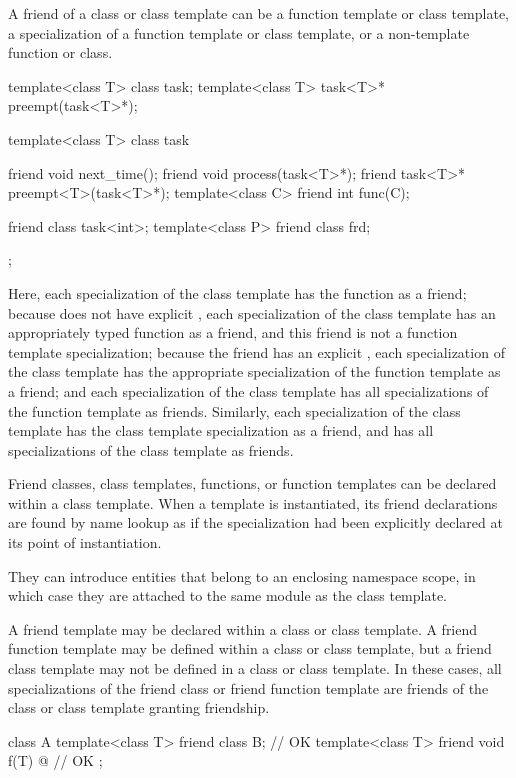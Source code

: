 \pnum
{}%
A friend of a class or class template can be a function template or
class template, a specialization of a function template or class
template, or a non-template function or class.
\begin{example}
\begin{codeblock}
template<class T> class task;
template<class T> task<T>* preempt(task<T>*);

template<class T> class task {
  friend void next_time();
  friend void process(task<T>*);
  friend task<T>* preempt<T>(task<T>*);
  template<class C> friend int func(C);

  friend class task<int>;
  template<class P> friend class frd;
};
\end{codeblock}

Here,
each specialization of the
class template has the function
as a friend;
because
does not have explicit
,
each specialization of the
class template has an appropriately typed function
as a friend, and this friend is not a function template specialization;
because the friend
has an explicit
,
each specialization of the
class template has the appropriate specialization of the function
template
as a friend;
and each specialization of the
class template has all specializations of the function template
as friends.
Similarly,
each specialization of the
class template has the class template specialization
as a friend, and has all specializations of the class template
as friends.
\end{example}

\pnum
Friend classes, class templates, functions, or function templates
can be declared within a class template.
When a template is instantiated,
its friend declarations are found by name lookup
as if the specialization had been explicitly declared at
its point of instantiation.
\begin{note}
They can introduce entities
that belong to an enclosing namespace scope,
in which case they are attached to
the same module as the class template.
\end{note}

\pnum
A friend template may be declared within a class or class template.
A friend function template may be defined within a class or class
template, but a friend class template may not be defined in a class
or class template.
In these cases, all specializations of the friend class or friend function
template are friends of the class or class template granting friendship.
\begin{example}
\begin{codeblock}
class A {
  template<class T> friend class B;                 // OK
  template<class T> friend void f(T) { @\commentellip@ }  // OK
};
\end{codeblock}
\end{example}

